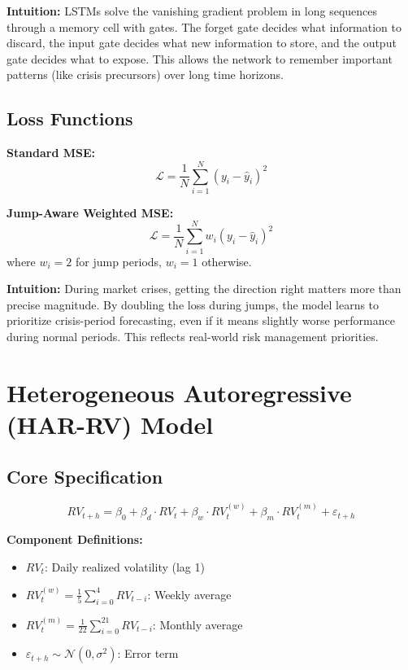 \documentclass{article}
\begin{document}
\textbf{Intuition:} LSTMs solve the vanishing gradient problem in long sequences through a memory cell with gates. The forget gate decides what information to discard, the input gate decides what new information to store, and the output gate decides what to expose. This allows the network to remember important patterns (like crisis precursors) over long time horizons.

\subsection{Loss Functions}
\textbf{Standard MSE:}
\begin{equation}
\mathcal{L} = \frac{1}{N}\sum_{i=1}^{N}(y_i - \hat{y}_i)^2
\end{equation}

\textbf{Jump-Aware Weighted MSE:}
\begin{equation}
\mathcal{L} = \frac{1}{N}\sum_{i=1}^{N} w_i(y_i - \hat{y}_i)^2
\end{equation}
where $w_i = 2$ for jump periods, $w_i = 1$ otherwise.

\textbf{Intuition:} During market crises, getting the direction right matters more than precise magnitude. By doubling the loss during jumps, the model learns to prioritize crisis-period forecasting, even if it means slightly worse performance during normal periods. This reflects real-world risk management priorities.

\section{Heterogeneous Autoregressive (HAR-RV) Model}

\subsection{Core Specification}
\begin{equation}
RV_{t+h} = \beta_0 + \beta_d \cdot RV_t + \beta_w \cdot RV_t^{(w)} + \beta_m \cdot RV_t^{(m)} + \varepsilon_{t+h}
\end{equation}

\textbf{Component Definitions:}
\begin{itemize}
\item $RV_t$: Daily realized volatility (lag 1)
\item $RV_t^{(w)} = \frac{1}{5}\sum_{i=0}^{4} RV_{t-i}$: Weekly average
\item $RV_t^{(m)} = \frac{1}{22}\sum_{i=0}^{21} RV_{t-i}$: Monthly average
\item $\varepsilon_{t+h} \sim \mathcal{N}(0, \sigma^2)$: Error term
\end{itemize}
\end{document}
